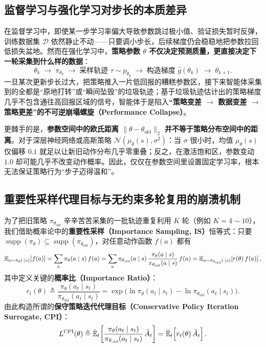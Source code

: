 \subsection{监督学习与强化学习对步长的本质差异}

在监督学习中，即使某一步学习率偏大导致参数跳过极小值、验证损失暂时反弹，训练数据集 $\mathcal{D}$ 依然静止不动——只要调小步长，后续梯度仍会稳稳地把参数拉回低损失盆地。然而在强化学习中，\textbf{策略参数 $\theta$ 不仅决定预测质量，更直接决定下一轮采集到什么样的数据}：
\[
  \theta_k \;\longrightarrow\; \pi_{\theta_k} \;\longrightarrow\; \text{采样轨迹 } \tau \sim p_{\theta_k} \;\longrightarrow\; \text{构造梯度 } \hat{g}(\theta_k) \;\longrightarrow\; \theta_{k+1}.
\]
一旦某次更新步长过大，把策略推入一片低回报的糟糕参数区，接下来智能体采集到的全都是“原地打转”或“瞬间坠毁”的垃圾轨迹；基于垃圾轨迹估计出的策略梯度几乎不包含通往高回报区域的信号，智能体于是陷入\textbf{“策略变差 $\to$ 数据变差 $\to$ 策略更差”的不可逆崩塌螺旋（Performance Collapse）}。

更棘手的是，\textbf{参数空间中的欧氏距离 $\|\theta - \theta_{\mathrm{old}}\|_2$ 并不等于策略分布空间中的距离}。对于深层神经网络或高斯策略 $\mathcal{N}(\mu_\theta(s), \sigma^2)$：当 $\sigma$ 很小时，均值 $\mu_\theta(s)$ 仅偏移 $0.1$ 就足以让新旧动作分布几乎零重叠；反之，在激活饱和区，参数变动 $1.0$ 却可能几乎不改变动作概率。因此，仅仅在参数空间里设置固定学习率，根本无法保证策略行为“步子迈得温和”。

\subsection{重要性采样代理目标与无约束多轮复用的崩溃机制}

为了把旧策略 $\pi_{\theta_{\mathrm{old}}}$ 辛辛苦苦采集的一批轨迹重复利用 $K$ 轮（例如 $K = 4 \sim 10$），我们借助概率论中的\textbf{重要性采样（Importance Sampling, IS）}恒等式：只要 $\operatorname{supp}(\pi_\theta) \subseteq \operatorname{supp}(\pi_{\theta_{\mathrm{old}}})$，对任意动作函数 $f(a)$ 都有
\begin{equation}
  \mathbb{E}_{a \sim \pi_\theta(\cdot \mid s)}[f(a)]
  = \sum_a \pi_\theta(a \mid s)\, f(a)
  = \sum_a \pi_{\theta_{\mathrm{old}}}(a \mid s)\,\frac{\pi_\theta(a \mid s)}{\pi_{\theta_{\mathrm{old}}}(a \mid s)}\, f(a)
  = \mathbb{E}_{a \sim \pi_{\theta_{\mathrm{old}}}(\cdot \mid s)}\!\left[r(\theta)\, f(a)\right],
  \label{eq:is-identity}
\end{equation}
其中定义关键的\textbf{概率比（Importance Ratio）}：
\begin{equation}
  r_t(\theta) \triangleq \frac{\pi_\theta(a_t \mid s_t)}{\pi_{\theta_{\mathrm{old}}}(a_t \mid s_t)}
  = \exp\!\Big(\ln \pi_\theta(a_t \mid s_t) - \ln \pi_{\theta_{\mathrm{old}}}(a_t \mid s_t)\Big).
  \label{eq:is-ratio}
\end{equation}
由此构造所谓的\textbf{保守策略迭代代理目标（Conservative Policy Iteration Surrogate, CPI）}：
\begin{equation}
  L^{\mathrm{CPI}}(\theta) \triangleq \hat{\mathbb{E}}_t\!\left[\frac{\pi_\theta(a_t \mid s_t)}{\pi_{\theta_{\mathrm{old}}}(a_t \mid s_t)}\,\hat{A}_t\right]
  = \hat{\mathbb{E}}_t\!\left[r_t(\theta)\,\hat{A}_t\right].
  \label{eq:cpi-surrogate}
\end{equation}

